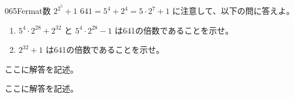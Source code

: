 \begin{prob}{065}{}{Fermat数 $2^{2^5}+1$}
 $641=5^4+2^4=5\cdot 2^7 +1$ に注意して、以下の問に答えよ。
 \begin{enumerate}
  \item $5^4\cdot 2^{28}+2^{32}$ と $5^4\cdot 2^{28} -1$ は641の倍数であることを示せ。
  \item $2^{32}+1$ は641の倍数であることを示せ。
 \end{enumerate}
\end{prob}
ここに解答を記述。

ここに解答を記述。